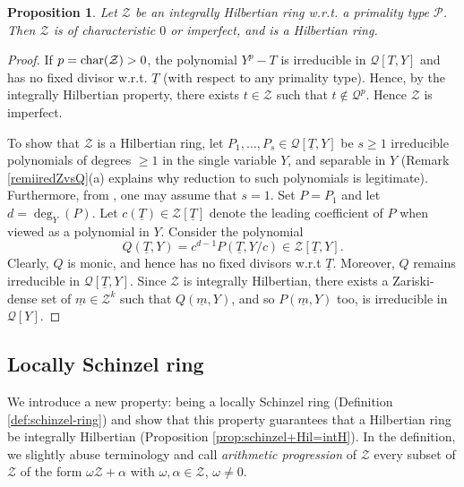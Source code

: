 \documentclass[11pt,a4paper,reqno]{amsart}
\newtheorem{prop}[thm]{Proposition}
\theoremstyle{definition}
\begin{document}
\begin{prop} \label{intH=>Hring}
Let ${\mathcal Z}$ be an integrally Hilbertian ring \hbox{w.r.t.} a primality type ${\mathcal P}$. Then ${\mathcal Z}$ is of characteristic $0$ or imperfect, 
and is a Hilbertian ring.
\end{prop}

\begin{proof}
If $p={\rm char}({\mathcal Z})>0$, the polynomial $Y^p-T$ is irreducible in ${\mathcal Q}[T,Y]$ and has no fixed divisor \hbox{w.r.t.} ${\underline T}$ (with respect to any primality type). Hence, by the integrally Hilbertian property, there exists $t\in {\mathcal Z}$ such that $t\notin {\mathcal Q}^p$. Hence ${\mathcal Z}$ is imperfect.

To show that ${\mathcal Z}$ is a Hilbertian ring, let $P_1,\ldots,P_s \in \mathcal{Q}[\underline{T},Y]$ be $s\geq 1$ irreducible polynomials of degrees $\geq 1$ in the single variable $Y$, and separable in $Y$ (Remark \ref{remiiredZvsQ}(a) explains why reduction to such polynomials is legitimate). Furthermore, from \cite[Lemma 13.1.6]{FJ23}, one may assume that $s=1$. Set $P=P_1$ and let $d=\deg_Y(P)$. Let $c(\underline{T}) \in \mathcal{Z}[\underline{T}]$ denote the leading coefficient of $P$ when viewed as a polynomial in $Y$. Consider the polynomial 
$$
Q(\underline{T},Y)=c^{d-1}P(\underline{T},Y/c) \in \mathcal{Z}[\underline{T},Y].
$$ Clearly, $Q$ is monic, and hence has no fixed divisors w.r.t $\underline{T}$. Moreover, $Q$ remains irreducible in $\mathcal{Q}[\underline{T},Y]$. Since $\mathcal{Z}$ is integrally Hilbertian, there exists a Zariski-dense set of $\underline{m} \in \mathcal{Z}^k$ such that $Q(\underline{m},Y)$, and so $P(\underline{m},Y)$ too, is irreducible in $\mathcal{Q}[Y]$.    
\end{proof}







\subsection{Locally Schinzel ring} \label{ssec:Schinzel_ring} 
We introduce a new property: being a locally Schinzel ring (Definition \ref{def:schinzel-ring}) and show that this property guarantees that a Hilbertian ring
be integrally Hilbertian (Proposition \ref{prop:schinzel+Hil=intH}). 
In the definition, we slightly abuse terminology  and call {\it arithmetic progression} of ${\mathcal Z}$ every subset of ${\mathcal Z}$ of the form $\omega {\mathcal Z} + \alpha$ with $\omega, \alpha \in {\mathcal Z}$, $\omega \not= 0$.
\end{document}
